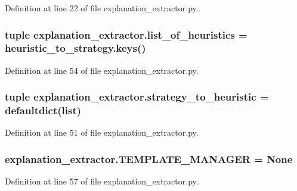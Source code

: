 Definition at line 22 of file explanation\+\_\+extractor.\+py.

\hypertarget{namespaceexplanation__extractor_a4f4d79f4f4c8925bd6353200232eb735}{}
\subsubsection[{list\+\_\+of\+\_\+heuristics}]{\setlength{\rightskip}{0pt plus 5cm}tuple explanation\+\_\+extractor.\+list\+\_\+of\+\_\+heuristics = heuristic\+\_\+to\+\_\+strategy.\+keys()}\label{namespaceexplanation__extractor_a4f4d79f4f4c8925bd6353200232eb735}


Definition at line 54 of file explanation\+\_\+extractor.\+py.

\hypertarget{namespaceexplanation__extractor_ac32b3e381284882ab71367fde9f5c646}{}
\subsubsection[{strategy\+\_\+to\+\_\+heuristic}]{\setlength{\rightskip}{0pt plus 5cm}tuple explanation\+\_\+extractor.\+strategy\+\_\+to\+\_\+heuristic = defaultdict(list)}\label{namespaceexplanation__extractor_ac32b3e381284882ab71367fde9f5c646}


Definition at line 51 of file explanation\+\_\+extractor.\+py.

\hypertarget{namespaceexplanation__extractor_add16cd790071f284854455eddfa329a1}{}
\subsubsection[{T\+E\+M\+P\+L\+A\+T\+E\+\_\+\+M\+A\+N\+A\+G\+E\+R}]{\setlength{\rightskip}{0pt plus 5cm}explanation\+\_\+extractor.\+T\+E\+M\+P\+L\+A\+T\+E\+\_\+\+M\+A\+N\+A\+G\+E\+R = None}\label{namespaceexplanation__extractor_add16cd790071f284854455eddfa329a1}


Definition at line 57 of file explanation\+\_\+extractor.\+py.

